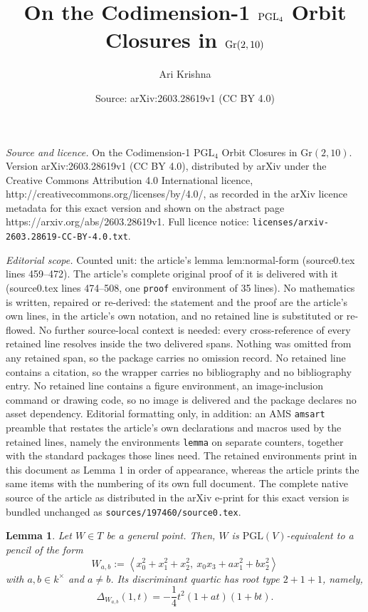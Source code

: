 \documentclass[10pt,a4paper]{amsart}
\title{On the Codimension-1 \texorpdfstring{$\PGL_4$}{PGL4} Orbit Closures in \texorpdfstring{$\G(2,10)$}{Gr(2,10)}}
\author{Ari Krishna}
\date{Source: arXiv:2603.28619v1 (CC BY 4.0)}
\newcommand{\G}{\mathrm{Gr}}
\newtheorem{lemma}{Lemma}
\newcommand{\PGL}{\mathrm{PGL}}
\begin{document}
\maketitle

\noindent\emph{Source and licence.} On the Codimension-1 \texorpdfstring{$\PGL_4$}{PGL4} Orbit Closures in \texorpdfstring{$\G(2,10)$}{Gr(2,10)}. Version arXiv:2603.28619v1 (CC BY 4.0), distributed by arXiv under the Creative Commons Attribution 4.0 International licence, http://creativecommons.org/licenses/by/4.0/, as recorded in the arXiv licence metadata for this exact version and shown on the abstract page https://arxiv.org/abs/2603.28619v1. Full licence notice: \texttt{licenses/arxiv-2603.28619-CC-BY-4.0.txt}.\par\smallskip

\noindent\textit{Editorial scope.} Counted unit: the article's lemma lem:normal-form (source0.tex lines 459--472). The article's complete original proof of it is delivered with it (source0.tex lines 474--508, one \texttt{proof} environment of 35 lines). No mathematics is written, repaired or re-derived: the statement and the proof are the article's own lines, in the article's own notation, and no retained line is substituted or re-flowed.  No further source-local context is needed: every cross-reference of every retained line resolves inside the two delivered spans.  Nothing was omitted from any retained span, so the package carries no omission record.  No retained line contains a citation, so the wrapper carries no bibliography and no bibliography entry.  No retained line contains a figure environment, an image-inclusion command or drawing code, so no image is delivered and the package declares no asset dependency.  Editorial formatting only, in addition: an AMS \texttt{amsart} preamble that restates the article's own declarations and macros used by the retained lines, namely the environments \texttt{lemma} on separate counters, together with the standard packages those lines need.  The retained environments print in this document as Lemma 1 in order of appearance, whereas the article prints the same items with the numbering of its own full document.  The complete native source of the article as distributed in the arXiv e-print for this exact version is bundled unchanged as \texttt{sources/197460/source0.tex}.
\begin{lemma}\label{lem:normal-form}
Let $W\in T$ be a general point. Then, $W$ is $\PGL(V)$-equivalent to a pencil of the form
\[
W_{a,b}:=
\left \langle
x_0^2+x_1^2+x_2^2,\
 x_0x_3 + a x_1^2 + b x_2^2
\right \rangle
\]
with $a,b\in k^\times$ and $a\neq b$. Its discriminant quartic has root type $2+1+1$, namely,
\[
\Delta_{W_{a,b}}(1,t) = -\frac14 t^2(1+at)(1+bt).
\]
\end{lemma}
\end{document}
